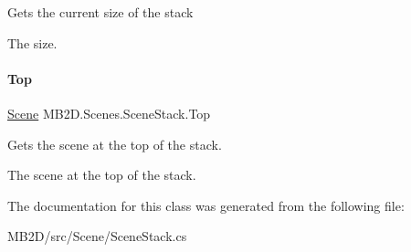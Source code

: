 Gets the current size of the stack 

The size.\hypertarget{class_m_b2_d_1_1_scenes_1_1_scene_stack_ad409d4fad58a067955ee1f6ed88229ef}{}\label{class_m_b2_d_1_1_scenes_1_1_scene_stack_ad409d4fad58a067955ee1f6ed88229ef} 
\paragraph{\texorpdfstring{Top}{Top}}
{\footnotesize\ttfamily \hyperlink{class_m_b2_d_1_1_scenes_1_1_scene}{Scene} M\+B2\+D.\+Scenes.\+Scene\+Stack.\+Top\hspace{0.3cm}{\ttfamily [get]}}



Gets the scene at the top of the stack. 

The scene at the top of the stack.

The documentation for this class was generated from the following file\+:\begin{DoxyCompactItemize}
\item 
M\+B2\+D/src/\+Scene/Scene\+Stack.\+cs\end{DoxyCompactItemize}

